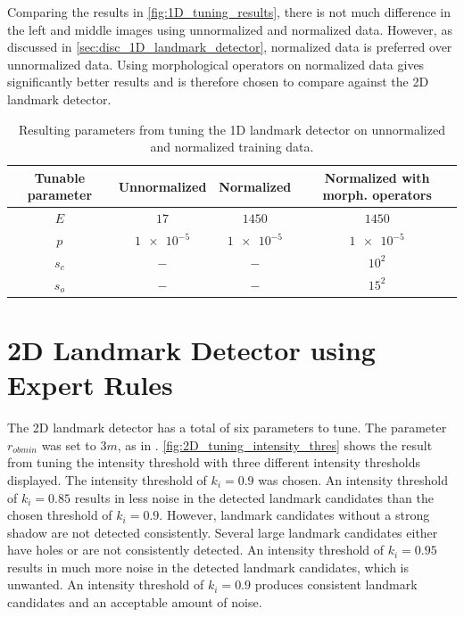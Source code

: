Comparing the results in \cref{fig:1D_tuning_results}, there is not much difference in the left and middle images using unnormalized and normalized data. However, as discussed in \cref{sec:disc_1D_landmark_detector}, normalized data is preferred over unnormalized data. Using morphological operators on normalized data gives significantly better results and is therefore chosen to compare against the 2D landmark detector.

\begin{table} [h!]
    \caption{Resulting parameters from tuning the 1D landmark detector on unnormalized and normalized training data.}
    \centering
    \begin{tabular}{cccc}
        \hline
        \textbf{Tunable parameter} & \textbf{Unnormalized} & \textbf{Normalized} & \textbf{Normalized with morph. operators} \\ \hline
        $E$                        & $17$                  & $1450$              & $1450$                                    \\
        $p$                        & $\num{1e-5}$          & $\num{1e-5}$        & $\num{1e-5}$                              \\
        $s_c$                      & $-$                   & $-$                 & $10^2$                                    \\
        $s_o$                      & $-$                   & $-$                 & $15^2$                                    \\ \hline
    \end{tabular}
    \label{tab:1D_parameters}
\end{table}

\section{2D Landmark Detector using Expert Rules}

The 2D landmark detector has a total of six parameters to tune. The parameter $r_{ob min}$ was set to $3 m $, as in \cite{Leblond2019SonarProject}. \cref{fig:2D_tuning_intensity_thres} shows the result from tuning the intensity threshold with three different intensity thresholds displayed. The intensity threshold of $k_i = 0.9$ was chosen. An intensity threshold of $k_i = 0.85$ results in less noise in the detected landmark candidates than the chosen threshold of $k_i = 0.9$. However, landmark candidates without a strong shadow are not detected consistently. Several large landmark candidates either have holes or are not consistently detected. An intensity threshold of $k_i = 0.95$ results in much more noise in the detected landmark candidates, which is unwanted. An intensity threshold of $k_i = 0.9$ produces consistent landmark candidates and an acceptable amount of noise. 

